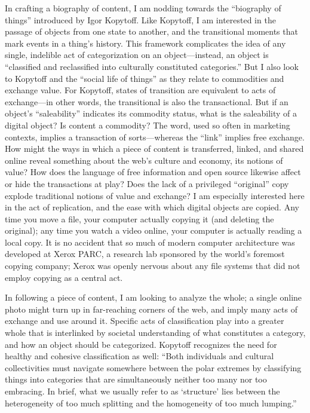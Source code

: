 In crafting a biography of content, I am nodding towards the “biography of things” introduced by Igor Kopytoff. Like Kopytoff, I am interested in the passage of objects from one state to another, and the transitional moments that mark events in a thing’s history. This framework complicates the idea of any single, indelible act of categorization on an object—instead, an object is “classified and reclassified into culturally constituted categories.”  But I also look to Kopytoff and the “social life of things” as they relate to commodities and exchange value. For Kopytoff, states of transition are equivalent to acts of exchange—in other words, the transitional is also the transactional. But if an object’s “saleability” indicates its commodity status, what is the saleability of a digital object? Is content a commodity? The word, used so often in marketing contexts, implies a transaction of sorts—whereas the “link” implies free exchange. How might the ways in which a piece of content is transferred, linked, and shared online reveal something about the web’s culture and economy, its notions of value? How does the language of free information and open source likewise affect or hide the transactions at play? Does the lack of a privileged “original” copy explode traditional notions of value and exchange? I am especially interested here in the act of replication, and the ease with which digital objects are copied. Any time you move a file, your computer actually copying it (and deleting the original); any time you watch a video online, your computer is actually reading a local copy. It is no accident that so much of modern computer architecture was developed at Xerox PARC, a research lab sponsored by the world’s foremost copying company; Xerox was openly nervous about any file systems that did not employ copying as a central act. 

In following a piece of content, I am looking to analyze the whole; a single online photo might turn up in far-reaching corners of the web, and imply many acts of exchange and use around it. Specific acts of classification play into a greater whole that is interlinked by societal understanding of what constitutes a category, and how an object should be categorized. Kopytoff recognizes the need for healthy and cohesive classification as well: “Both individuals and cultural collectivities must navigate somewhere between the polar extremes by classifying things into categories that are simultaneously neither too many nor too embracing. In brief, what we usually refer to as ‘structure’ lies between the heterogeneity of too much splitting and the homogeneity of too much lumping.” 

